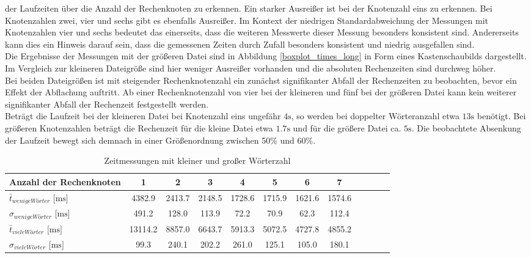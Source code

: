 der Laufzeiten über die Anzahl der Rechenknoten zu erkennen. Ein starker Ausreißer ist bei der Knotenzahl eins zu erkennen. Bei Knotenzahlen zwei, vier und sechs gibt es ebenfalls Ausreißer. Im Kontext der niedrigen Standardabweichung der Messungen mit Knotenzahlen vier und sechs bedeutet das einerseits, dass die weiteren Messwerte dieser Messung besonders konsistent sind. Andererseits kann dies ein Hinweis darauf sein, dass die gemessenen Zeiten durch Zufall besonders konsistent und niedrig ausgefallen sind.
\\
Die Ergebnisse der Messungen mit der größeren Datei sind in Abbildung \ref{boxplot_times_long} in Form eines Kastenschaubilds dargestellt. Im Vergleich zur kleineren Dateigröße sind hier weniger Ausreißer vorhanden und die absoluten Rechenzeiten sind durchweg höher.
\\
Bei beiden Dateigrößen ist mit steigender Rechenknotenzahl ein zunächst signifikanter Abfall der Rechenzeiten zu beobachten, bevor ein Effekt der Abflachung auftritt. Ab einer Rechenknotenzahl von vier bei der kleineren und fünf bei der größeren Datei kann kein weiterer signifikanter Abfall der Rechenzeit festgestellt werden.
\\
Beträgt die Laufzeit bei der kleineren Datei bei Knotenzahl eins ungefähr $4\text{s}$, so werden bei doppelter Wörteranzahl etwa $13\text{s}$ benötigt. Bei größeren Knotenzahlen beträgt die Rechenzeit für die kleine Datei etwa $1.7\text{s}$ und für die größere Datei ca. $5\text{s}$. Die beobachtete Absenkung der Laufzeit bewegt sich demnach in einer Größenordnung zwischen 50\% und 60\%.


\begin{table}
	\caption{Zeitmessungen mit kleiner und großer Wörterzahl}
	\label{zeiten_tabelle_lang_und_kurz}
	\begin{tabularx}{\textwidth}{@{}l*{10}{C}c@{}}
		\toprule
		Anzahl der Rechenknoten & 1 & 2 & 3 & 4 & 5 & 6 & 7 \\ 
		\midrule
		$\bar{t}_{wenige Wörter}$ $\text{[ms]}$ & 4382.9 & 2413.7 & 2148.5 & 1728.6 & 1715.9 & 1621.6 & 1574.6 \\
		$\sigma_{wenige Wörter}$ $\text{[ms]}$ & 491.2 & 128.0 & 113.9 & 72.2 & 70.9 & 62.3 & 112.4 \\
		\addlinespace
		$\bar{t}_{viele Wörter}$ $\text{[ms]}$ & 13114.2 & 8857.0 & 6643.7 & 5913.3 & 5072.5 & 4727.8 & 4855.2 \\
		$\sigma_{viele Wörter}$ $\text{[ms]}$ & 99.3 & 240.1 & 202.2 & 261.0 & 125.1 & 105.0 & 180.1 \\
		\bottomrule
	\end{tabularx}
\end{table}


